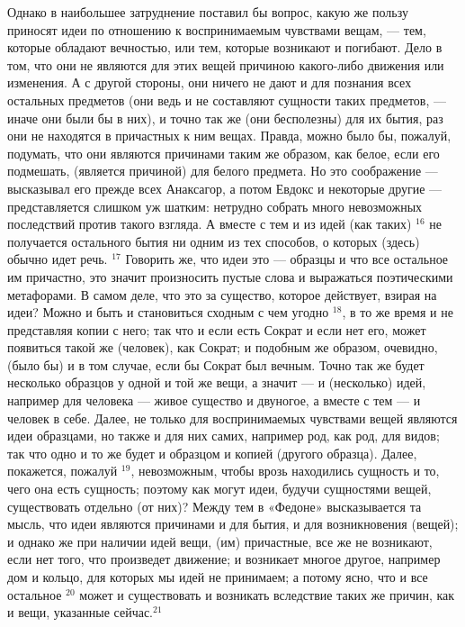 \documentclass[oneside, 17pt, dvipsnames]{extbook}
\begin{document}
Однако в наибольшее затруднение поставил бы вопрос, какую же пользу приносят идеи по отношению к воспринимаемым чувствами вещам, — тем, которые обладают вечностью, или тем, которые возникают и погибают. Дело в том, что они не являются для этих вещей причиною какого-либо движения или изменения. А с другой стороны, они ничего не дают и для познания всех остальных предметов (они ведь и не составляют сущности таких предметов, — иначе они были бы в них), и точно так же (они бесполезны) для их бытия, раз они не находятся в причастных к ним вещах. Правда, можно было бы, пожалуй, подумать, что они являются причинами таким же образом, как белое, если его подмешать, (является причиной) для белого предмета. Но это соображение — высказывал его прежде всех Анаксагор, а потом Евдокс и некоторые другие — представляется слишком уж шатким: нетрудно собрать много невозможных последствий против такого взгляда. А вместе с тем и из идей (как таких) $^{16}$ не получается остального бытия ни одним из тех способов, о которых (здесь) обычно идет речь. $^{17}$ Говорить же, что идеи это — образцы и что все остальное им причастно, это значит произносить пустые слова и выражаться поэтическими метафорами. В самом деле, что это за существо, которое действует, взирая на идеи? Можно и быть и становиться сходным с чем угодно $^{18}$, в то же время и не представляя копии с него; так что и если есть Сократ и если нет его, может появиться такой же (человек), как Сократ; и подобным же образом, очевидно, (было бы) и в том случае, если бы Сократ был вечным. Точно так же будет несколько образцов у одной и той же вещи, а значит — и (несколько) идей, например для человека — живое существо и двуногое, а вместе с тем — и человек в себе. Далее, не только для воспринимаемых чувствами вещей являются идеи образцами, но также и для них самих, например род, как род, для видов; так что одно и то же будет и образцом и копией (другого образца). Далее, покажется, пожалуй $^{19}$, невозможным, чтобы врозь находились сущность и то, чего она есть сущность; поэтому как могут идеи, будучи сущностями вещей, существовать отдельно (от них)? Между тем в «Федоне» высказывается та мысль, что идеи являются причинами и для бытия, и для возникновения (вещей); и однако же при наличии идей вещи, (им) причастные, все же не возникают, если нет того, что произведет движение; и возникает многое другое, например дом и кольцо, для которых мы идей не принимаем; а потому ясно, что и все остальное $^{20}$ может и существовать и возникать вследствие таких же причин, как и вещи, указанные сейчас.$^{21}$
\end{document}
